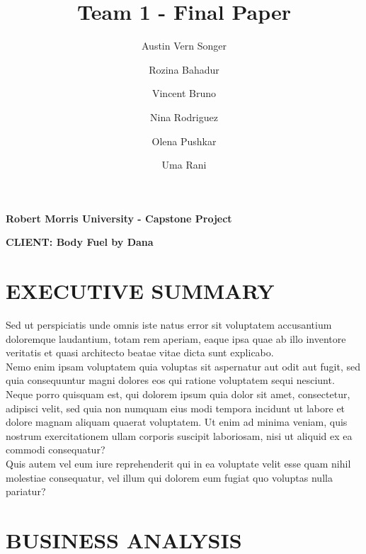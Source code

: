\documentclass[letterpaper,12pt,2p]{elsarticle}
\begin{document}
\begin{frontmatter}
\title{Team 1 - Final Paper}
\author[]{Austin Vern Songer}
\author[]{Rozina Bahadur}
\author[]{Vincent Bruno}
\author[]{Nina Rodriguez}
\author[]{Olena Pushkar}
\author[]{Uma Rani}
\end{frontmatter}
\begin{center}
\textbf{ Robert Morris University - Capstone Project}
\end{center}
\begin{center}
\textbf{CLIENT: Body Fuel by Dana}
\end{center}


\newpage

\tableofcontents

\clearpage

\section{ EXECUTIVE SUMMARY}%
\label{ES}%

Sed ut perspiciatis unde omnis iste natus error sit voluptatem accusantium doloremque laudantium, totam rem aperiam, eaque ipsa quae ab illo inventore veritatis et quasi architecto beatae vitae dicta sunt explicabo.\\

Nemo enim ipsam voluptatem quia voluptas sit aspernatur aut odit aut fugit, sed quia consequuntur magni dolores eos qui ratione voluptatem sequi nesciunt. Neque porro quisquam est, qui dolorem ipsum quia dolor sit amet, consectetur, adipisci velit, sed quia non numquam eius modi tempora incidunt ut labore et dolore magnam aliquam quaerat voluptatem. Ut enim ad minima veniam, quis nostrum exercitationem ullam corporis suscipit laboriosam, nisi ut aliquid ex ea commodi consequatur?\\ 

Quis autem vel eum iure reprehenderit qui in ea voluptate velit esse quam nihil molestiae consequatur, vel illum qui dolorem eum fugiat quo voluptas nulla pariatur?



\newpage 

\section{ BUSINESS ANALYSIS}%
\label{BA}%
\end{document}
